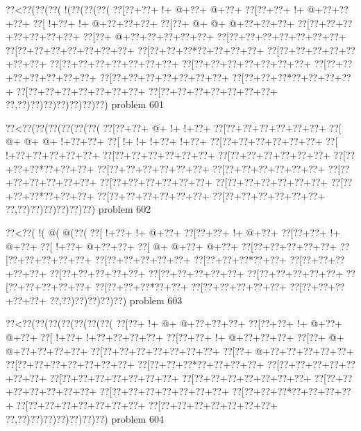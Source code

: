 \vbox{\vbox{\goo
\0??<\0??(\0??(\0??(\- !(\0??(\0??(\0??(
\0??[\0??+\0??+\- !+\- @+\0??+\- @+\0??+
\0??[\0??+\0??+\- !+\- @+\0??+\0??+\0??+
\0??[\- !+\0??+\- !+\- @+\0??+\0??+\0??+
\0??[\0??+\- @+\- @+\- @+\0??+\0??+\0??+
\0??[\0??+\0??+\0??+\0??+\0??+\0??+\0??+
\0??[\0??+\- @+\0??+\0??+\0??+\0??+\0??+
\0??[\0??+\0??+\0??+\0??+\0??+\0??+\0??+
\0??[\0??+\0??+\0??+\0??+\0??+\0??+\0??+
\0??[\0??+\0??+\0??*\0??+\0??+\0??+\0??+
\0??[\0??+\0??+\0??+\0??+\0??+\0??+\0??+
\0??[\0??+\0??+\0??+\0??+\0??+\0??+\0??+
\0??[\0??+\0??+\0??+\0??+\0??+\0??+\0??+
\0??[\0??+\0??+\0??+\0??+\0??+\0??+\0??+
\0??[\0??+\0??+\0??+\0??+\0??+\0??+\0??+
\0??[\0??+\0??+\0??*\0??+\0??+\0??+\0??+
\0??[\0??+\0??+\0??+\0??+\0??+\0??+\0??+
\0??[\0??+\0??+\0??+\0??+\0??+\0??+\0??+
\0??,\0??)\0??)\0??)\0??)\0??)\0??)\0??)
}
\hfil problem 601\hfil\break
}

\vbox{\vbox{\goo
\0??<\0??(\0??(\0??(\0??(\0??(\0??(
\0??[\0??+\0??+\- @+\- !+\- !+\0??+
\0??[\0??+\0??+\0??+\0??+\0??+\0??+
\0??[\- @+\- @+\- @+\- !+\0??+\0??+
\0??[\- !+\- !+\- !+\0??+\- !+\0??+
\0??[\0??+\0??+\0??+\0??+\0??+\0??+
\0??[\- !+\0??+\0??+\0??+\0??+\0??+
\0??[\0??+\0??+\0??+\0??+\0??+\0??+
\0??[\0??+\0??+\0??+\0??+\0??+\0??+
\0??[\0??+\0??+\0??*\0??+\0??+\0??+
\0??[\0??+\0??+\0??+\0??+\0??+\0??+
\0??[\0??+\0??+\0??+\0??+\0??+\0??+
\0??[\0??+\0??+\0??+\0??+\0??+\0??+
\0??[\0??+\0??+\0??+\0??+\0??+\0??+
\0??[\0??+\0??+\0??+\0??+\0??+\0??+
\0??[\0??+\0??+\0??*\0??+\0??+\0??+
\0??[\0??+\0??+\0??+\0??+\0??+\0??+
\0??[\0??+\0??+\0??+\0??+\0??+\0??+
\0??,\0??)\0??)\0??)\0??)\0??)\0??)
}
\hfil problem 602\hfil\break
}

\vbox{\vbox{\goo
\0??<\0??(\- !(\- @(\- @(\0??(
\0??[\- !+\0??+\- !+\- @+\0??+
\0??[\0??+\0??+\- !+\- @+\0??+
\0??[\0??+\0??+\- !+\- @+\0??+
\0??[\- !+\0??+\- @+\0??+\0??+
\0??[\- @+\- @+\0??+\- @+\0??+
\0??[\0??+\0??+\0??+\0??+\0??+
\0??[\0??+\0??+\0??+\0??+\0??+
\0??[\0??+\0??+\0??+\0??+\0??+
\0??[\0??+\0??+\0??*\0??+\0??+
\0??[\0??+\0??+\0??+\0??+\0??+
\0??[\0??+\0??+\0??+\0??+\0??+
\0??[\0??+\0??+\0??+\0??+\0??+
\0??[\0??+\0??+\0??+\0??+\0??+
\0??[\0??+\0??+\0??+\0??+\0??+
\0??[\0??+\0??+\0??*\0??+\0??+
\0??[\0??+\0??+\0??+\0??+\0??+
\0??[\0??+\0??+\0??+\0??+\0??+
\0??,\0??)\0??)\0??)\0??)\0??)
}
\hfil problem 603\hfil\break
}

\vbox{\vbox{\goo
\0??<\0??(\0??(\0??(\0??(\0??(\0??(\0??(
\0??[\0??+\- !+\- @+\- @+\0??+\0??+\0??+
\0??[\0??+\0??+\- !+\- @+\0??+\- @+\0??+
\0??[\- !+\0??+\- !+\0??+\0??+\0??+\0??+
\0??[\0??+\0??+\- !+\- @+\0??+\0??+\0??+
\0??[\0??+\- @+\- @+\0??+\0??+\0??+\0??+
\0??[\0??+\0??+\0??+\0??+\0??+\0??+\0??+
\0??[\0??+\- @+\0??+\0??+\0??+\0??+\0??+
\0??[\0??+\0??+\0??+\0??+\0??+\0??+\0??+
\0??[\0??+\0??+\0??*\0??+\0??+\0??+\0??+
\0??[\0??+\0??+\0??+\0??+\0??+\0??+\0??+
\0??[\0??+\0??+\0??+\0??+\0??+\0??+\0??+
\0??[\0??+\0??+\0??+\0??+\0??+\0??+\0??+
\0??[\0??+\0??+\0??+\0??+\0??+\0??+\0??+
\0??[\0??+\0??+\0??+\0??+\0??+\0??+\0??+
\0??[\0??+\0??+\0??*\0??+\0??+\0??+\0??+
\0??[\0??+\0??+\0??+\0??+\0??+\0??+\0??+
\0??[\0??+\0??+\0??+\0??+\0??+\0??+\0??+
\0??,\0??)\0??)\0??)\0??)\0??)\0??)\0??)
}
\hfil problem 604\hfil\break
}

